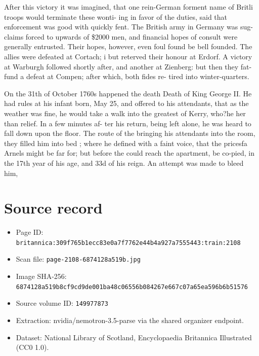 \documentclass{article}
\begin{document}
After this victory it was imagined, that one rein-German forment name of Britli troops would terminate these wonti- ing in favor of the duties, said that enforcement was good with quickly fent. The British army in Germany was sug- claims forced to upwards of \$2000 men, and financial hopes of consult were generally entrusted. Their hopes, however, even foul found be bell founded. The allies were defeated at Cortach; i but reterved their honour at Erdorf. A victory at Warburgh followed shortly after, and another at Zienberg: but then they fat- fund a defeat at Compen; after which, both fides re- tired into winter-quarters.

On the 31th of October 1760s happened the death Death of King George II. He had rules at his infant born, May 25, and offered to his attendants, that as the weather was fine, he would take a walk into the greatest of Kerry, who?he her than relief. In a few minutes af- ter his return, being left alone, he was heard to fall down upon the floor. The route of the bringing his attendants into the room, they filled him into bed ; where he defined with a faint voice, that the pricesfa Arnels might be far for; but before the could reach the apartment, be co-pied, in the 17th year of his age, and 33d of his reign. An attempt was made to bleed him,

\section*{Source record}
\begin{itemize}
\item Page ID: \texttt{britannica:309f765b1ecc83e0a7f7762e44b4a927a7555443:train:2108}
\item Scan file: \texttt{page-2108-6874128a519b.jpg}
\item Image SHA-256: \texttt{6874128a519b8cf9cd9de001ba48c06556b084267e667c07a65ea596b6b51576}
\item Source volume ID: \texttt{149977873}
\item Extraction: nvidia/nemotron-3.5-parse via the shared organizer endpoint.
\item Dataset: National Library of Scotland, Encyclopaedia Britannica Illustrated (CC0 1.0).
\end{itemize}
\end{document}
